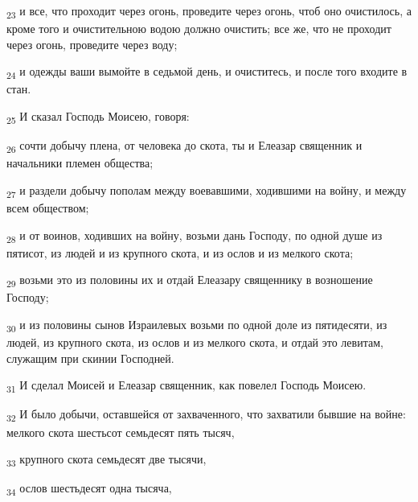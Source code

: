 \begin{tcolorbox}
\textsubscript{23} и все, что проходит через огонь, проведите через огонь, чтоб оно очистилось, а кроме того и очистительною водою должно очистить; все же, что не проходит через огонь, проведите через воду;
\end{tcolorbox}
\begin{tcolorbox}
\textsubscript{24} и одежды ваши вымойте в седьмой день, и очиститесь, и после того входите в стан.
\end{tcolorbox}
\begin{tcolorbox}
\textsubscript{25} И сказал Господь Моисею, говоря:
\end{tcolorbox}
\begin{tcolorbox}
\textsubscript{26} сочти добычу плена, от человека до скота, ты и Елеазар священник и начальники племен общества;
\end{tcolorbox}
\begin{tcolorbox}
\textsubscript{27} и раздели добычу пополам между воевавшими, ходившими на войну, и между всем обществом;
\end{tcolorbox}
\begin{tcolorbox}
\textsubscript{28} и от воинов, ходивших на войну, возьми дань Господу, по одной душе из пятисот, из людей и из крупного скота, и из ослов и из мелкого скота;
\end{tcolorbox}
\begin{tcolorbox}
\textsubscript{29} возьми это из половины их и отдай Елеазару священнику в возношение Господу;
\end{tcolorbox}
\begin{tcolorbox}
\textsubscript{30} и из половины сынов Израилевых возьми по одной доле из пятидесяти, из людей, из крупного скота, из ослов и из мелкого скота, и отдай это левитам, служащим при скинии Господней.
\end{tcolorbox}
\begin{tcolorbox}
\textsubscript{31} И сделал Моисей и Елеазар священник, как повелел Господь Моисею.
\end{tcolorbox}
\begin{tcolorbox}
\textsubscript{32} И было добычи, оставшейся от захваченного, что захватили бывшие на войне: мелкого скота шестьсот семьдесят пять тысяч,
\end{tcolorbox}
\begin{tcolorbox}
\textsubscript{33} крупного скота семьдесят две тысячи,
\end{tcolorbox}
\begin{tcolorbox}
\textsubscript{34} ослов шестьдесят одна тысяча,
\end{tcolorbox}
